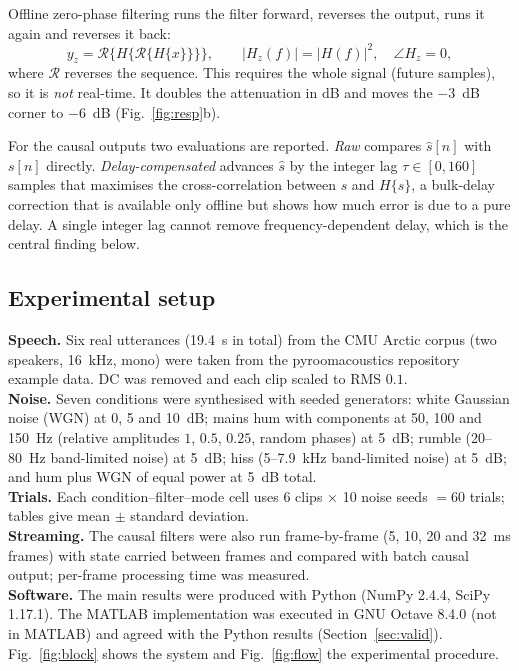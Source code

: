 \documentclass[conference]{IEEEtran}
\begin{document}
Offline zero-phase filtering runs the filter forward, reverses the output, runs it again and reverses it back:
\begin{equation}
y_z=\mathcal{R}\{H\{\mathcal{R}\{H\{x\}\}\}\},\qquad |H_z(f)|=|H(f)|^2,\quad \angle H_z=0,
\label{eq:zp}
\end{equation}
where $\mathcal{R}$ reverses the sequence. This requires the whole signal (future samples), so it is \emph{not} real-time. It doubles the attenuation in dB and moves the $-3$~dB corner to $-6$~dB (Fig.~\ref{fig:resp}b).

For the causal outputs two evaluations are reported. \emph{Raw} compares $\hat{s}[n]$ with $s[n]$ directly. \emph{Delay-compensated} advances $\hat{s}$ by the integer lag $\tau\in[0,160]$ samples that maximises the cross-correlation between $s$ and $H\{s\}$, a bulk-delay correction that is available only offline but shows how much error is due to a pure delay. A single integer lag cannot remove frequency-dependent delay, which is the central finding below.

\subsection{Experimental setup}
\textbf{Speech.} Six real utterances (19.4~s in total) from the CMU Arctic corpus (two speakers, 16~kHz, mono) were taken from the pyroomacoustics repository example data. DC was removed and each clip scaled to RMS $0.1$.\\
\textbf{Noise.} Seven conditions were synthesised with seeded generators: white Gaussian noise (WGN) at 0, 5 and 10~dB; mains hum with components at 50, 100 and 150~Hz (relative amplitudes $1$, $0.5$, $0.25$, random phases) at 5~dB; rumble (20--80~Hz band-limited noise) at 5~dB; hiss (5--7.9~kHz band-limited noise) at 5~dB; and hum plus WGN of equal power at 5~dB total.\\
\textbf{Trials.} Each condition--filter--mode cell uses 6 clips $\times$ 10 noise seeds $=60$ trials; tables give mean $\pm$ standard deviation.\\
\textbf{Streaming.} The causal filters were also run frame-by-frame (5, 10, 20 and 32~ms frames) with state carried between frames and compared with batch causal output; per-frame processing time was measured.\\
\textbf{Software.} The main results were produced with Python (NumPy 2.4.4, SciPy 1.17.1). The MATLAB implementation was executed in GNU Octave 8.4.0 (not in MATLAB) and agreed with the Python results (Section~\ref{sec:valid}). Fig.~\ref{fig:block} shows the system and Fig.~\ref{fig:flow} the experimental procedure.
\end{document}
